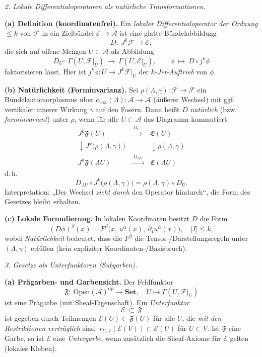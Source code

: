 \documentclass[10pt, letterpaper]{article}
\begin{document}
\bigskip
\emph{2. Lokale Differentialoperatoren als natürliche Transformationen.}

\textbf{(a) Definition (koordinatenfrei).}
Ein \emph{lokaler Differentialoperator der Ordnung $\le k$} von $\mathcal F$
in ein Zielbündel $\mathcal E\to\mathcal A$ ist eine glatte Bündelabbildung
\[
D:\ J^k\mathcal F \longrightarrow \mathcal E,
\]
die sich auf offene Mengen $U\subset\mathcal A$ als Abbildung
\[
D_U:\ \Gamma(U,\mathcal F|_U)\ \longrightarrow\ \Gamma(U,\mathcal E|_U),
\qquad
\phi\ \mapsto\ D\circ j^k\phi
\]
faktorisieren lässt. Hier ist $j^k\phi:U\to J^k\mathcal F|_U$ der \emph{$k$-Jet-Auftrieb}
von $\phi$.

\textbf{(b) Natürlichkeit (Forminvarianz).}
Sei $\rho(\Lambda,\gamma):\mathcal F\to\mathcal F$ ein Bündelautomorphismus
über $\alpha_{\mathrm{ext}}(\Lambda):\mathcal A\to\mathcal A$ (äußerer Wechsel)
mit ggf. vertikaler innerer Wirkung $\gamma$ auf den Fasern.
Dann heißt $D$ \emph{natürlich} (bzw. \emph{forminvariant}) unter $\rho$, wenn
für alle $U\subset\mathcal A$ das Diagramm kommutiert:
\[
\begin{array}{ccc}
J^k\mathfrak F(U) & \xrightarrow{\ \ D_U\ \ } & \mathfrak E(U)\\[0.4em]
\downarrow J^k\big(\rho(\Lambda,\gamma)\big) & & \downarrow \rho(\Lambda,\gamma)\\[0.4em]
J^k\mathfrak F(\Lambda U) & \xrightarrow{\ \ D_{\Lambda U}\ \ } & \mathfrak E(\Lambda U)
\end{array}
\]
d.\,h.
\[
D_{\Lambda U}\circ J^k\big(\rho(\Lambda,\gamma)\big)
=\rho(\Lambda,\gamma)\circ D_U.
\]
Interpretation: „Der Wechsel \emph{zieht durch} den Operator hindurch“,
die Form des Gesetzes bleibt erhalten.

\textbf{(c) Lokale Formulierung.}
In lokalen Koordinaten besitzt $D$ die Form
\[
(D\phi)^\beta(x)=F^\beta\big(x,\,u^\alpha(x),\,\partial_I u^\alpha(x)\big),\quad |I|\le k,
\]
wobei \emph{Natürlichkeit} bedeutet, dass die $F^\beta$ die Tensor-/Darstellungsregeln
unter $(\Lambda,\gamma)$ erfüllen (kein expliziter Koordinaten-/Basisbruch).

\bigskip
\emph{3. Gesetze als Unterfunktoren (Subgarben).}

\textbf{(a) Prägarben- und Garbensicht.}
Der Feldfunktor
\[
\mathfrak F:\ \mathrm{Open}(\mathcal A)^{\mathrm{op}}\longrightarrow \mathbf{Set},\quad
U\mapsto \Gamma(U,\mathcal F|_U)
\]
ist eine Prägarbe (mit Sheaf-Eigenschaft). Ein \emph{Unterfunktor}
\[
\mathcal E\ \subset\ \mathfrak F
\]
ist gegeben durch Teilmengen $\mathcal E(U)\subset\mathfrak F(U)$ für alle
$U$, die \emph{mit den Restriktionen verträglich} sind:
$r_{U,V}(\mathcal E(V))\subset \mathcal E(U)$ für $U\subset V$.
Ist $\mathfrak F$ eine Garbe, so ist $\mathcal E$ eine \emph{Untergarbe},
wenn zusätzlich die Sheaf-Axiome für $\mathcal E$ gelten (lokales Kleben).
\end{document}
